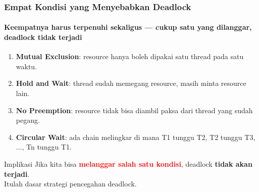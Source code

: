 \documentclass[t,aspectratio=169,xcolor=dvipsnames]{beamer}
\newcommand{\tem}[1]{\textbf{\textcolor{red}{#1}}}
\begin{document}
\begin{frame}
    \frametitle{Empat Kondisi yang Menyebabkan Deadlock}
    \framesubtitle{Keempatnya harus terpenuhi sekaligus — cukup satu yang dilanggar, deadlock tidak terjadi}
    \small

    \begin{enumerate}
        \item[\textbf{C1}] \textbf{Mutual Exclusion}: resource hanya boleh dipakai satu thread pada satu waktu.
        \vspace{0.3em}
        \item[\textbf{C2}] \textbf{Hold and Wait}: thread sudah memegang resource, masih minta resource lain.
        \vspace{0.3em}
        \item[\textbf{C3}] \textbf{No Preemption}: resource tidak bisa diambil paksa dari thread yang sudah pegang.
        \vspace{0.3em}
        \item[\textbf{C4}] \textbf{Circular Wait}: ada chain melingkar di mana T1 tunggu T2, T2 tunggu T3, ..., Tn tunggu T1.
    \end{enumerate}

    \vspace{0.5em}
    \begin{block}{Implikasi}
        \centering
        Jika kita bisa \tem{melanggar salah satu kondisi}, deadlock \textbf{tidak akan terjadi}.\\
        Itulah dasar strategi pencegahan deadlock.
    \end{block}
\end{frame}
\end{document}
